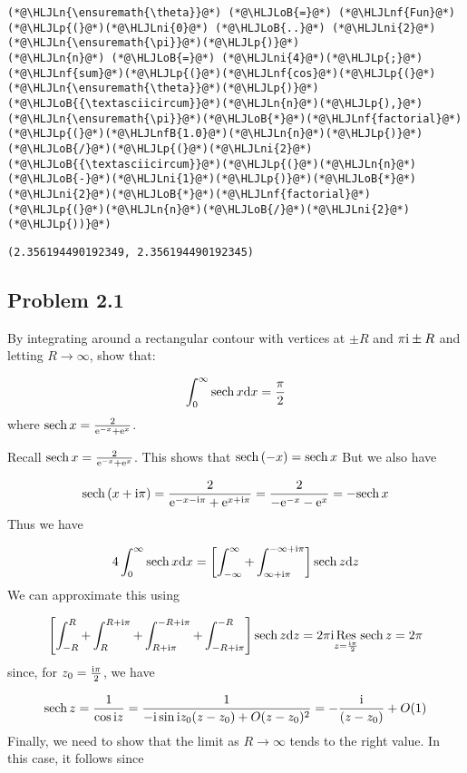 \documentclass[12pt,landscape]{article}
\newcommand{\HLJLn}[1]{#1}
\newcommand{\HLJLnf}[1]{\textcolor[RGB]{66,102,213}{#1}}
\newcommand{\HLJLnfB}[1]{\textcolor[RGB]{59,151,46}{#1}}
\newcommand{\HLJLni}[1]{\textcolor[RGB]{59,151,46}{#1}}
\newcommand{\HLJLoB}[1]{\textcolor[RGB]{102,102,102}{\textbf{#1}}}
\newcommand{\HLJLp}[1]{#1}
\def\D{ {\rm d} }
\def\I{ {\rm i} }
\def\E{ {\rm e} }
\def\Res_#1{\underset{#1}{\rm Res}\,}
\def\sech{ {\rm sech}\, }
\def\dx{\D x}
\def\dz{\D z}
\begin{document}
{\begin{lstlisting}
(*@\HLJLn{\ensuremath{\theta}}@*) (*@\HLJLoB{=}@*) (*@\HLJLnf{Fun}@*)(*@\HLJLp{(}@*)(*@\HLJLni{0}@*) (*@\HLJLoB{..}@*) (*@\HLJLni{2}@*)(*@\HLJLn{\ensuremath{\pi}}@*)(*@\HLJLp{)}@*)
(*@\HLJLn{n}@*) (*@\HLJLoB{=}@*) (*@\HLJLni{4}@*)(*@\HLJLp{;}@*)
(*@\HLJLnf{sum}@*)(*@\HLJLp{(}@*)(*@\HLJLnf{cos}@*)(*@\HLJLp{(}@*)(*@\HLJLn{\ensuremath{\theta}}@*)(*@\HLJLp{)}@*)(*@\HLJLoB{{\textasciicircum}}@*)(*@\HLJLn{n}@*)(*@\HLJLp{),}@*) (*@\HLJLn{\ensuremath{\pi}}@*)(*@\HLJLoB{*}@*)(*@\HLJLnf{factorial}@*)(*@\HLJLp{(}@*)(*@\HLJLnfB{1.0}@*)(*@\HLJLn{n}@*)(*@\HLJLp{)}@*)(*@\HLJLoB{/}@*)(*@\HLJLp{(}@*)(*@\HLJLni{2}@*)(*@\HLJLoB{{\textasciicircum}}@*)(*@\HLJLp{(}@*)(*@\HLJLn{n}@*)(*@\HLJLoB{-}@*)(*@\HLJLni{1}@*)(*@\HLJLp{)}@*)(*@\HLJLoB{*}@*)(*@\HLJLni{2}@*)(*@\HLJLoB{*}@*)(*@\HLJLnf{factorial}@*)(*@\HLJLp{(}@*)(*@\HLJLn{n}@*)(*@\HLJLoB{/}@*)(*@\HLJLni{2}@*)(*@\HLJLp{))}@*)
\end{lstlisting}

\begin{lstlisting}
(2.356194490192349, 2.356194490192345)
\end{lstlisting}


\subsection{Problem 2.1}
By integrating around a rectangular contour with vertices at $\pm R$ and $\pi \I \pm R$ and letting $R \rightarrow \infty$, show that:

\[
\int_0^\infty \sech x \dx = {\pi \over 2}
\]
where $\sech x = {2 \over \E^{-x} + \E^x}$.

Recall $\sech x = {2 \over \E^{-x} + \E^x} $. This shows that $\sech(-x) = \sech x$ But we also have

\[
\sech(x + \I \pi) =  {2 \over \E^{-x-\I \pi} + \E^{x+ \I \pi}} =  {2 \over -\E^{-x} - \E^{x}} = -\sech x
\]
Thus we have

\[
    4\int_0^\infty \sech x \dx = \left[ \int_{-\infty}^\infty + \int_{\infty+\I\pi}^{-\infty + \I \pi} \right] \sech z \dz
\]
We can approximate this using

\[
\left[ \int_{-R}^R + \int_R^{R+\I \pi} + \int_{R+\I \pi}^{-R+\I\pi} + \int_{-R+\I \pi}^{-R} \right ] \sech z \dz = 2 \pi \I \Res_{z = {\I \pi \over 2}} \sech z  = 2 \pi
\]
since, for $z_0 = {\I \pi \over 2}$, we have

\[
\sech z = {1 \over \cos \I z} = {1 \over - \I \sin \I z_0 (z- z_0) + O(z-z_0)^2}
= -{\I \over (z- z_0)} + O(1)
\]
Finally, we need to show that the limit as $R \rightarrow \infty$ tends to the right value. In this case, it follows since

}
\end{document}
